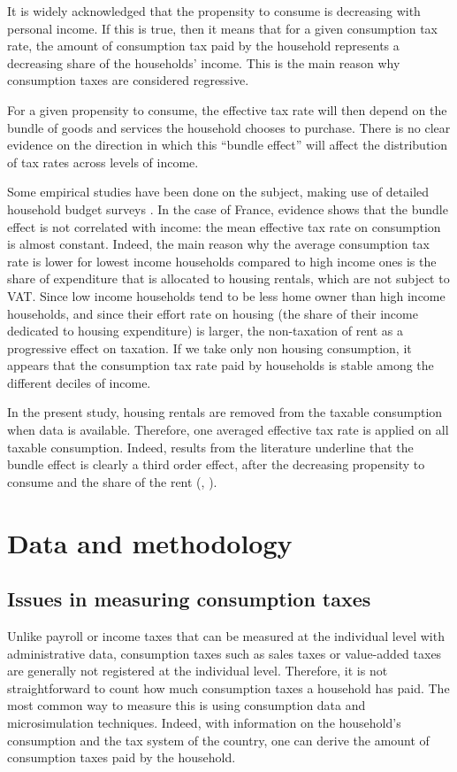 \documentclass[12pt]{article}
\begin{document}
It is widely acknowledged that the propensity to consume is decreasing with personal income. If this is true, then it means that for a given consumption tax rate, the amount of consumption tax paid by the household represents a decreasing share of the households' income. This is the main reason why consumption taxes are considered regressive.

For a given propensity to consume, the effective tax rate will then depend on the bundle of goods and services the household chooses to purchase. There is no clear evidence on the direction in which this ``bundle effect'' will affect the distribution of tax rates across levels of income.

Some empirical studies have been done on the subject, making use of detailed household budget surveys \citep{dauvergne2012qui, boutchenik2015}. In the case of France, evidence shows that the bundle effect is not correlated with income: the mean effective tax rate on consumption is almost constant. Indeed, the main reason why the average consumption tax rate is lower for lowest income households compared to high income ones is the share of expenditure that is allocated to housing rentals, which are not subject to VAT. Since low income households tend to be less home owner than high income households, and since their effort rate on housing (the share of their income dedicated to housing expenditure) is larger, the non-taxation of rent as a progressive effect on taxation. If we take only non housing consumption, it appears that the consumption tax rate paid by households is stable among the different deciles of income. 

In the present study, housing rentals are removed from the taxable consumption when data is available. Therefore, one averaged effective tax rate is applied on all taxable consumption. Indeed, results from the literature underline that the bundle effect is clearly a third order effect, after the decreasing propensity to consume and the share of the rent (\cite{figari2015microsimulation}, \cite{decoster2010}).

\section{Data and methodology}

\subsection{Issues in measuring consumption taxes}
Unlike payroll or income taxes that can be measured at the individual level with administrative data, consumption taxes such as sales taxes or value-added taxes are generally not registered at the individual level. Therefore, it is not straightforward to count how much consumption taxes a household has paid. The most common way to measure this is using consumption data and microsimulation techniques. Indeed, with information on the household's consumption and the tax system of the country, one can derive the amount of consumption taxes paid by the household.
\end{document}
